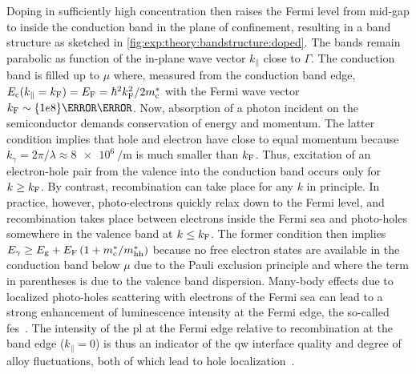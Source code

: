 Doping in sufficiently high concentration then raises the Fermi level from mid-gap to inside the conduction band in the plane of confinement, resulting in a band structure as sketched in \cref{fig:exp:theory:bandstructure:doped}.
The bands remain parabolic as function of the in-plane wave vector $k_{\parallel}$ close to $\Gamma$.
The conduction band is filled up to $\mu$ where, measured from the conduction band edge, $E_{\mathrm{c}}(k_{\parallel} = k_{\mathrm{F}}) = E_{\mathrm{F}} = \hbar^2 k_{\mathrm{F}}^2/2m^\ast_{\mathrm{c}}$ with the Fermi wave vector $k_{\mr{F}}\sim\qty{1e8}{\per\meter}$.
Now, absorption of a photon incident on the semiconductor demands conservation of energy and momentum.
The latter condition implies that hole and electron have close to equal momentum because $k_{\gamma} = 2\pi/\lambda\approx\qty{8e6}{\per\meter}$ is much smaller than $k_{\mathrm{F}}$.
Thus, excitation of an electron-hole pair from the valence into the conduction band occurs only for $k\geq k_{\mathrm{F}}$.
By contrast, recombination can take place for any $k$ in principle.
In practice, however, photo-electrons quickly relax down to the Fermi level, and recombination takes place between electrons inside the Fermi sea and photo-holes somewhere in the valence band at $k\leq k_{\mathrm{F}}$.
The former condition then implies $E_{\gamma} \geq E_{\mathrm{g}} + E_{\mathrm{F}}\left(1 + m^{\ast}_{\mathrm{c}}/m^{\ast}_{\mathrm{hh}}\right)$ because no free electron states are available in the conduction band below $\mu$ due to the Pauli exclusion principle and where the term in parentheses is due to the valence band dispersion.
Many-body effects due to localized photo-holes scattering with electrons of the Fermi sea can lead to a strong enhancement of luminescence intensity at the Fermi edge, the so-called \gls{fes}~\cite{Mahan1967,Mahan1967a,Skolnick1987}.
The intensity of the \gls{pl} at the Fermi edge relative to recombination at the band edge ($k_{\parallel} = 0$) is thus an indicator of the \gls{qw} interface quality and degree of alloy fluctuations, both of which lead to hole localization~\cite{Melin2000,Gabbay2008}.

